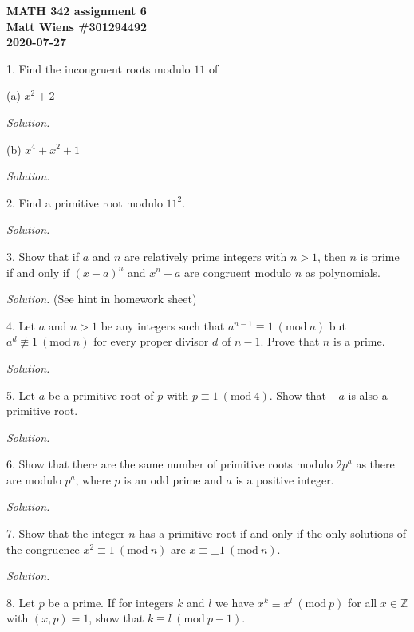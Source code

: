 \documentclass{article}
\newcommand{\Mod}[1]{\ (\mathrm{mod}\ #1)}
\newcommand{\Z}{\mathbb{Z}}
\begin{document}
\textbf{MATH 342 assignment 6} \\
\textbf{Matt Wiens \#301294492} \\
\textbf{2020-07-27}

1. Find the incongruent roots modulo $11$ of

(a) $x^2 + 2$

\textit{Solution.}

\vspace{5mm}

(b) $x^4 + x^2 + 1$

\textit{Solution.}

\newpage

2. Find a primitive root modulo $11^2$.

\textit{Solution.}

\newpage

3. Show that if $a$ and $n$ are relatively prime integers with $n > 1$,
then $n$ is prime if and only if $(x - a)^n$ and $x^n - a$ are congruent
modulo $n$ as polynomials.

\textit{Solution.}
(See hint in homework sheet)

\newpage

4. Let $a$ and $n > 1$ be any integers such that $a^{n - 1} \equiv 1 \Mod{n}$
but $a^d \not\equiv 1 \Mod{n}$ for every proper divisor $d$ of $n - 1$. Prove
that $n$ is a prime.

\textit{Solution.}

\newpage

5. Let $a$ be a primitive root of $p$ with $p \equiv 1 \Mod{4}$. Show
that $-a$ is also a primitive root.

\textit{Solution.}

\newpage

6. Show that there are the same number of primitive roots modulo $2p^a$
as there are modulo $p^a$, where $p$ is an odd prime and $a$ is a
positive integer.

\textit{Solution.}

\newpage

7. Show that the integer $n$ has a primitive root if and only if the
only solutions of the congruence $x^2 \equiv 1 \Mod{n}$ are
$x \equiv \pm 1 \Mod{n}$.

\textit{Solution.}

\newpage

8. Let $p$ be a prime. If for integers $k$ and $l$ we have
$x^k \equiv x^l \Mod{p}$ for all $x \in \Z$ with $(x, p) = 1$,
show that $k \equiv l \Mod{p - 1}$.
\end{document}
